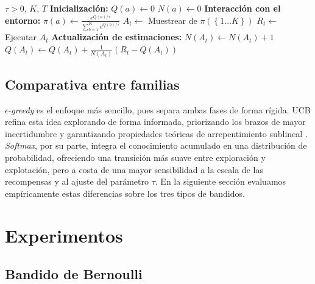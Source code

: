 \begin{algorithm}[H]
\caption{Algoritmo Softmax (Exploración Boltzmann)}
\label{alg:softmax}
\begin{algorithmic}[1]
\Require $\tau > 0$, $K$, $T$
\State \textbf{Inicialización:}
    \State $Q(a) \leftarrow 0$ 
    \State $N(a) \leftarrow 0$ 
\EndFor
\State \textbf{Interacción con el entorno:}
        \State $\pi(a) \leftarrow \frac{e^{Q(a) / \tau}}{\sum_{b=1}^K e^{Q(b) / \tau}}$ 
    \EndFor
    \State $A_t \leftarrow$ Muestrear de $\pi(\left\{1 \dots K\right\})$
    \State $R_t \leftarrow$ Ejecutar $A_t$ 
    \State \textbf{Actualización de estimaciones:}
    \State $N(A_t) \leftarrow N(A_t) + 1$
    \State $Q(A_t) \leftarrow Q(A_t) + \frac{1}{N(A_t)} \left( R_t - Q(A_t) \right)$
\EndFor
\end{algorithmic}
\end{algorithm}

\vspace{-10pt}

\subsection{Comparativa entre familias}
$\epsilon$-\textit{greedy} es el enfoque más sencillo, pues separa ambas fases de forma rígida. UCB refina esta idea explorando de forma informada, priorizando los brazos de mayor incertidumbre y garantizando propiedades teóricas de arrepentimiento sublineal \cite{auer2002}. \textit{Softmax}, por su parte, integra el conocimiento acumulado en una distribución de probabilidad, ofreciendo una transición más suave entre exploración y explotación, pero a costa de una mayor sensibilidad a la escala de las recompensas y al ajuste del parámetro $\tau$. En la siguiente sección evaluamos empíricamente estas diferencias sobre los tres tipos de bandidos.


\section{Experimentos}

\subsection{Bandido de Bernoulli}

